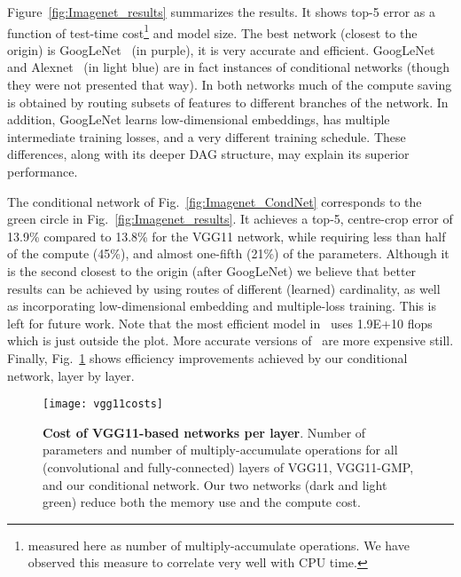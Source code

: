 \documentclass[thesis]{subfiles}
\begin{document}
Figure~\ref{fig:Imagenet_results} summarizes the results.
It shows top-5 error as a function of test-time 
cost\footnote{measured here as number of multiply-accumulate operations. We have observed this measure 
to correlate very well with CPU time.} and model size. 
The best network (closest to the origin) is GoogLeNet~\cite{Szegedy2014going} (in purple), it is very accurate and efficient. 
GoogLeNet and Alexnet~\cite{Krizhevsky2012imanet} (in light blue) are in fact instances of conditional networks 
(though they were not presented that way). In both networks much of the compute saving is obtained by routing
 subsets of features to different branches of the network.
In addition, GoogLeNet learns low-dimensional embeddings, has multiple intermediate training losses, and a very 
different training schedule. These differences, along with its deeper DAG structure, may explain its superior performance.

The conditional network of Fig.~\ref{fig:Imagenet_CondNet} 
corresponds to the green circle in Fig.~\ref{fig:Imagenet_results}.
It achieves a top-5, centre-crop error of
13.9\% compared to 13.8\% for the VGG11 network, while requiring less than half of the compute (45\%),
 and almost one-fifth (21\%) of the parameters.
Although it is the second closest to the origin (after GoogLeNet) we believe that better results can be achieved 
by using routes of different (learned) cardinality, as well as incorporating low-dimensional embedding and multiple-loss training. This is left for future work. 
Note that the most efficient model in~\cite{He2015delving} uses 1.9E+10 flops which is just outside the plot. 
More accurate versions of~\cite{He2015delving} are more expensive still.
Finally, Fig.~\ref{fig:VggPerLayerCost} shows efficiency improvements achieved by our conditional network, layer by layer.

\begin{figure}[t]
\centerline{
\texttt{[image: vgg11costs]}
}
   \caption{{\bf Cost of VGG11-based networks per layer}. 
   Number of parameters and number of multiply-accumulate operations for all (convolutional and fully-connected) 
   layers of VGG11, VGG11-GMP, and our conditional network. Our two networks (dark and light green) 
   reduce both the memory use and the compute cost.}
\label{fig:VggPerLayerCost}
\end{figure}



\end{document}
